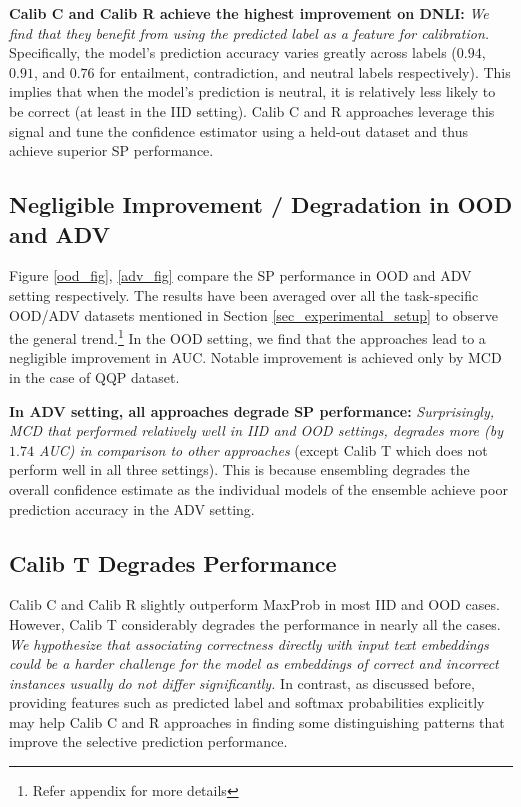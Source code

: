 \documentclass[11pt]{article}
\newcommand{\Neeraj}[1]{{\color{red} [Neeraj: #1]}}
\begin{document}
\textbf{Calib C and Calib R achieve the highest improvement on DNLI: }
\textit{We find that they benefit from using the predicted label as a feature for calibration.}
Specifically, the model's prediction accuracy varies greatly across labels ($0.94$, $0.91$, and $0.76$ for entailment, contradiction, and neutral labels respectively).
This implies that when the model's prediction is neutral, it is relatively less likely to be correct (at least in the IID setting). 
Calib C and R approaches leverage this signal and tune the confidence estimator using a held-out dataset and thus achieve superior SP performance.

\subsection{Negligible Improvement / Degradation in OOD and ADV}
Figure \ref{ood_fig}, \ref{adv_fig} compare the SP performance in OOD and ADV setting respectively.
The results have been averaged over all the task-specific OOD/ADV datasets mentioned in Section \ref{sec_experimental_setup} to observe the general trend.\footnote{Refer appendix for more details}
In the OOD setting, we find that the approaches lead to a negligible improvement in AUC. 
Notable improvement is achieved only by MCD in the case of QQP dataset.

\textbf{In ADV setting, all approaches degrade SP performance: }
\textit{Surprisingly, MCD that performed relatively well in IID and OOD settings, degrades more (by $1.74$ AUC) in comparison to other approaches} (except Calib T which does not perform well in all three settings).
This is because ensembling degrades the overall confidence estimate as the individual models of the ensemble achieve poor prediction accuracy in the ADV setting.



\subsection{Calib T Degrades Performance}
Calib C and Calib R slightly outperform MaxProb in most IID and OOD cases. 
However, Calib T considerably degrades the performance in nearly all the cases. 
\textit{We hypothesize that associating correctness directly with input text embeddings could be a harder challenge for the model as embeddings of correct and incorrect instances usually do not differ significantly. }
In contrast, as discussed before, providing features such as predicted label and softmax probabilities explicitly may help Calib C and R approaches in finding some distinguishing patterns that improve the selective prediction performance. 
\end{document}
